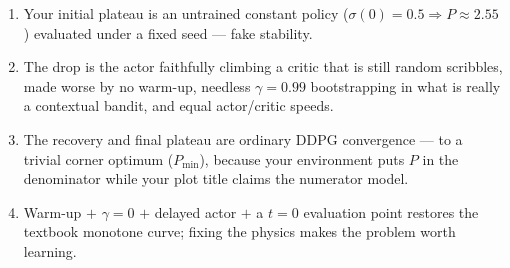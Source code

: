 \documentclass[11pt]{article}
\begin{document}
\begin{tcolorbox}[colback=softgray, colframe=black!40,
  title=\textbf{The whole diagnosis in four sentences}]
\begin{enumerate}
\item Your initial plateau is an untrained constant policy ($\sigma(0)=0.5 \Rightarrow
      P\approx2.55$) evaluated under a fixed seed --- fake stability.
\item The drop is the actor faithfully climbing a critic that is still random
      scribbles, made worse by no warm-up, needless $\gamma=0.99$ bootstrapping in
      what is really a contextual bandit, and equal actor/critic speeds.
\item The recovery and final plateau are ordinary DDPG convergence --- to a trivial
      corner optimum ($P_{\min}$), because your environment puts $P$ in the
      denominator while your plot title claims the numerator model.
\item Warm-up $+$ $\gamma=0$ $+$ delayed actor $+$ a $t{=}0$ evaluation point
      restores the textbook monotone curve; fixing the physics makes the problem
      worth learning.
\end{enumerate}
\end{tcolorbox}
\end{document}
